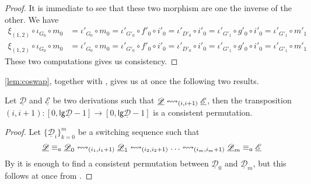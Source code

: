 \documentclass[a4paper,UKenglish,cleveref,pdftex, thm-restate,numberwithinsect,anonymous]{lipics}
\newcommand{\dder}[1]{\mathscr{#1}}
\newcommand{\der}[1]{\underline{\dder{#1}}}
\newcommand{\lgh}[0]{\mathsf{lg}}
\newcommand{\shift}[1]{\ensuremath{\mathrel{{\leftrightsquigarrow}_{#1}}}}
\begin{document}
\begin{proof}
	It is immediate to see that these two morphism are one the inverse of the other. We have
\begin{align*}		\xi_{(1,2)}\circ \iota_{G_0}\circ m_0&= \iota'_{G_0}\circ m_0=\iota'_{G'_0}\circ f'_0
	\circ i'_0=\iota'_{D'_0}\circ i'_0=	\iota'_{G'_1}\circ g'_0\circ i'_0=\iota'_{G'_1}\circ m'_1\\
			\xi_{(1,2)}\circ \iota_{G_0}\circ m_0&= \iota'_{G_0}\circ m_0=\iota'_{G'_0}\circ f'_0
	\circ i'_0=\iota'_{D'_0}\circ i'_0=	\iota'_{G'_1}\circ g'_0\circ i'_0=\iota'_{G'_1}\circ m'_1
\end{align*}
	These two computations gives us consistency.
\end{proof}



\cref{lem:coswap}, together with , gives us at once the following two results.

\begin{corollary}\label{cor:coswap}
Let $\der{D}$ and $\der{E}$ be two derivations such that $\der{D} \shift{\transp{i}} \der{E}$, then the transposition $(i,i+1):[0,\lgh{\der{D}}-1] \to [0,\lgh{\der{D}}-1] $ is a consistent permutation.
\end{corollary}


\propcoswitch*
\label{propcoswitch-proof}
\begin{proof}
	Let $\{\der{D}_{i}\}_{k=0}^m$ be a switching sequence such that 
	    \[\der{D}\equiv_a \der{D}_0 \shift{\transp{i_1}} \der{D}_1 \shift{\transp{i_2}} \ldots \shift{\transp{i_m}}
	\der{D}_m\equiv _a \der{E}\]
By  it is enough to find a consistent permutation between $\der{D}_0$ and $\der{D}_m$, but this follows at once from .
\end{proof}
\end{document}
